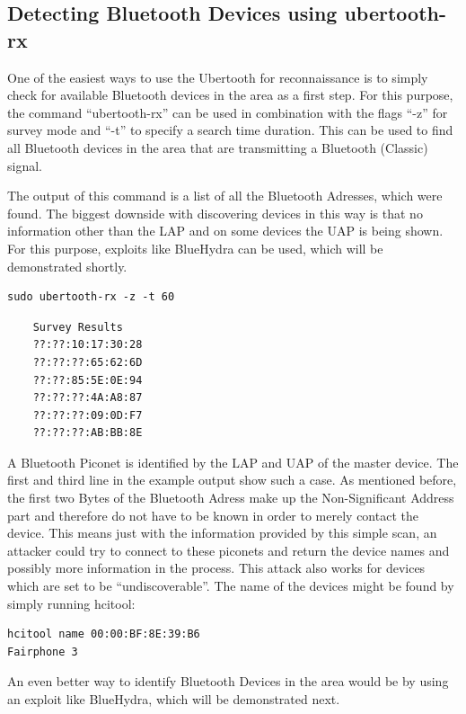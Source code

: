 \begin{itemize}
\subsection{Detecting Bluetooth Devices using ubertooth-rx}
\label{ubertooth-detection}

One of the easiest ways to use the Ubertooth for reconnaissance is to simply check for available Bluetooth devices in the area as a first step. For this purpose, the command ``ubertooth-rx'' can be used in combination with the flags ``-z'' for survey mode and ``-t'' to specify a search time duration. This can be used to find all Bluetooth devices in the area that are transmitting a Bluetooth (Classic) signal.\cite{ubertoothrx}

The output of this command is a list of all the Bluetooth Adresses, which were found. The biggest downside with discovering devices in this way is that no information other than the LAP and on some devices the UAP is being shown. For this purpose, exploits like BlueHydra can be used, which will be demonstrated shortly.
\begin{verbatim}
sudo ubertooth-rx -z -t 60
\end{verbatim}
\begin{verbatim}
    Survey Results
    ??:??:10:17:30:28
    ??:??:??:65:62:6D
    ??:??:85:5E:0E:94
    ??:??:??:4A:A8:87
    ??:??:??:09:0D:F7
    ??:??:??:AB:BB:8E
\end{verbatim}

A Bluetooth Piconet is identified by the LAP and UAP of the master device. The first and third line in the example output show such a case. As mentioned before, the first two Bytes of the Bluetooth Adress make up the Non-Significant Address part and therefore do not have to be known in order to merely contact the device. This means just with the information provided by this simple scan, an attacker could try to connect to these piconets and return the device names and possibly more information in the process. This attack also works for devices which are set to be ``undiscoverable''. The name of the devices might be found by simply running hcitool:\cite{https://github.com/greatscottgadgets/ubertooth/blob/master/host/doc/ubertooth-rx.md}

\begin{verbatim}
hcitool name 00:00:BF:8E:39:B6
Fairphone 3
\end{verbatim}

An even better way to identify Bluetooth Devices in the area would be by using an exploit like BlueHydra, which will be demonstrated next.


\end{itemize}
